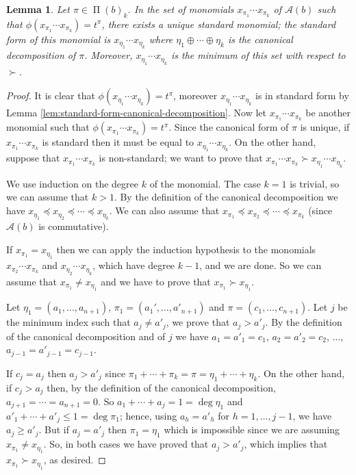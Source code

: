 \documentclass[12pt, a4paper]{amsart}   	%
\numberwithin{equation}{section}
\theoremstyle{plain}
\newtheorem{lemma}[theorem]{Lemma}
\theoremstyle{definition}
\newcommand{\mcA}{{\mathcal A}}
\DeclareMathOperator{\LS}{\Pi}
\begin{document}
\begin{lemma}\label{lem:standard-monomial-order}
Let $\pi\in\LS(b)_k$. In the set of monomials $x_{\pi_1}\cdots x_{\pi_k}$ of $\mcA(b)$ such that $\phi(x_{\pi_1}\cdots x_{\pi_k}) = t^\pi$, there exists a unique standard monomial; the standard form of this monomial is $x_{\eta_1}\cdots x_{\eta_k}$ where $\eta_1 \oplus \cdots \oplus \eta_k$ is the canonical decomposition of $\pi$. Moreover, $x_{\eta_1}\cdots x_{\eta_k}$ is the minimum of this set with respect to $\succ$.
\end{lemma}
\begin{proof} It is clear that $\phi(x_{\eta_1}\cdots x_{\eta_k}) = t^\pi$, moreover $x_{\eta_1}\cdots x_{\eta_k}$ is in standard form by Lemma \ref{lem:standard-form-canonical-decomposition}. Now let $x_{\pi_1}\cdots x_{\pi_k}$ be another monomial such that $\phi(x_{\pi_1}\cdots x_{\pi_k}) = t^\pi$. Since the canonical form of $\pi$ is unique, if $x_{\pi_1}\cdots x_{\pi_k}$ is standard then it must be equal to $x_{\eta_1}\cdots x_{\eta_k}$. On the other hand, suppose that $x_{\pi_1}\cdots x_{\pi_k}$ is non-standard; we want to prove that $x_{\pi_1}\cdots x_{\pi_k} \succ x_{\eta_1}\cdots x_{\eta_k}$.

We use induction on the degree $k$ of the monomial. The case $k=1$ is trivial, so we can assume that $k>1$. By the definition of the canonical decomposition we have $x_{\eta_1}\preceq x_{\eta_2}\preceq \cdots \preceq x_{\eta_k}$. We can also assume that $x_{\pi_1}\preceq x_{\pi_2}\preceq \cdots \preceq x_{\pi_k}$ (since $\mcA(b)$ is commutative).

If $x_{\pi_1} = x_{\eta_1}$ then we can apply the induction hypothesis to the monomials $x_{\pi_2}\cdots x_{\pi_k}$ and $x_{\eta_2}\cdots x_{\eta_k}$, which have degree $k-1$, and we are done. So we can assume that $x_{\pi_1}\neq x_{\eta_1}$ and we have to prove that $x_{\pi_1} \succ x_{\eta_1}$.

Let $\eta_1 = (a_1, \ldots, a_{n+1})$, $\pi_1 = (a_1',\ldots,a'_{n+1})$ and $\pi = (c_1,\ldots,c_{n+1})$. Let $j$ be the minimum index such that $a_j \neq a'_j$, we prove that $a_j > a'_j$. By the definition of the canonical decomposition and of $j$ we have $a_1 = a'_1 = c_1$, $a_2 = a'_2 = c_2$, $\ldots$, $a_{j-1} = a'_{j-1} = c_{j-1}$.

If $c_j = a_j$ then $a_j > a'_j$ since $\pi_1 + \cdots + \pi_k = \pi = \eta_1 + \cdots + \eta_k$. On the other hand, if $c_j > a_j$ then, by the definition of the canonical decomposition, $a_{j+1} = \cdots = a_{n+1} = 0$. So $a_1 + \cdots + a_j = 1 = \deg\eta_1$ and $a'_1 + \cdots + a'_j \leq 1 = \deg\pi_1$; hence, using $a_h = a'_h$ for $h = 1,\ldots, j - 1$, we have $a_j \geq a'_j$. But if $a_j = a'_j$ then $\pi_1 = \eta_1$ which is impossible since we are assuming $x_{\pi_1}\neq x_{\eta_1}$. So, in both cases we have proved that $a_j > a'_j$, which implies that $x_{\pi_1} \succ x_{\eta_1}$, as desired.
\end{proof}
\end{document}
